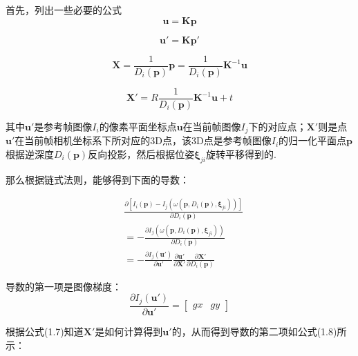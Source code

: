 首先，列出一些必要的公式
\begin{equation}
\bm{u} = \bm{K} \bm{p}
\end{equation}

\begin{equation}
\bm{u}' = \bm{K} \bm{p}'
\end{equation}

\begin{equation}
\bm{X} = \frac{1}{D_i(\bm{p})} \bm{p} =  \frac{1}{D_i(\bm{p})} \bm{K}^{-1} \bm{u}
\end{equation}

\begin{equation}
\bm{X}' = R \frac{1}{D_i(\bm{p})} \bm{K}^{-1} \bm{u} + t
\end{equation}


其中$\bm{u}'$是参考帧图像$I_i$的像素平面坐标点$\bm{u}$在当前帧图像$I_j$下的对应点；$\bm{X}'$则是点$\bm{u}'$在当前帧相机坐标系下所对应的3D点，该3D点是参考帧图像$I_i$的归一化平面点$\bm{p}$根据逆深度$D_i(\bm{p})$反向投影，然后根据位姿$\bm{\xi}_{ji}$旋转平移得到的.


那么根据链式法则，能够得到下面的导数：


\begin{equation}
	\begin{split}
		&\frac{\partial [I_i(\bm{p}) - I_j(\omega(\bm{p}, D_i(\bm{p}), \bm{\xi}_{ji}))]}{\partial D_i(\bm{p})} \\
		&= - \frac{\partial I_j(\omega(\bm{p}, D_i(\bm{p}), \bm{\xi}_{ji}))}{\partial D_i(\bm{p})} \\
		&= -\frac{\partial I_j(\bm{u}')}{\partial \bm{u}'} \frac{\partial \bm{u}'}{\partial \bm{X}'}  \frac{\partial \bm{X}'}{\partial D_i(\bm{p})}
	\end{split}
\end{equation}







导数的第一项是图像梯度：
\begin{equation}
\frac{\partial I_j(\bm{u}')}{\partial \bm{u}'} = 
	\left[
	\begin{array}{cc}
		gx & gy
	\end{array}
	\right]
\end{equation}

根据公式(1.7)知道$\bm{X}'$是如何计算得到$\bm{u}'$的，从而得到导数的第二项如公式(1.8)所示：

